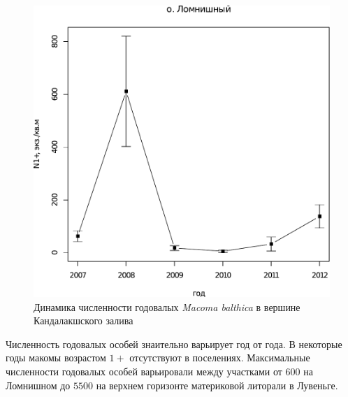 \begin{figure}[p]
\begin{minipage}[b]{.49\linewidth}
\begin{center}
		\includegraphics[width=\linewidth]{../White_Sea/Lomnishniy/Lomnishniy_N_oneyear1.pdf}
	\end{center}
	\end{minipage}

	\caption{Динамика численности годовалых {\it Macoma balthica} в вершине Кандалакшского залива}
	\label{ris:dynamic_1year_Kandalaksha}
	\end{figure}
Численность годовалых особей знаительно варьирует год от года. 
В некоторые годы макомы возрастом $1+$ отсутствуют в поселениях.
Максимальные численности годовалых особей варьировали между участками от $600$ на Ломнишном до $5500$ на верхнем горизонте материковой литорали в Лувеньге.


